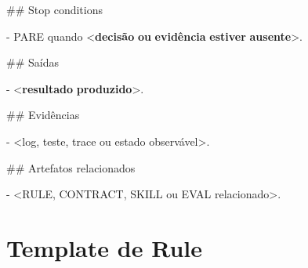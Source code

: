 \documentclass[
  10pt,
  a4paper,
  oneside]{book}
\newenvironment{Shaded}{}{}
\newcommand{\DataTypeTok}[1]{\textcolor[rgb]{0.56,0.13,0.00}{#1}}
\newcommand{\ErrorTok}[1]{\textcolor[rgb]{1.00,0.00,0.00}{\textbf{#1}}}
\newcommand{\FunctionTok}[1]{\textcolor[rgb]{0.02,0.16,0.49}{#1}}
\newcommand{\KeywordTok}[1]{\textcolor[rgb]{0.00,0.44,0.13}{\textbf{#1}}}
\newcommand{\NormalTok}[1]{#1}
\newcommand{\SpecialStringTok}[1]{\textcolor[rgb]{0.73,0.40,0.53}{#1}}
\begin{document}
\begin{Shaded}
\begin{Highlighting}[]
\FunctionTok{\#\# Stop conditions}

\SpecialStringTok{{-} }\NormalTok{PARE quando }\DataTypeTok{\textless{}}\KeywordTok{decisão} \ErrorTok{ou} \ErrorTok{evidência} \ErrorTok{estiver} \ErrorTok{ausente}\DataTypeTok{\textgreater{}}\NormalTok{.}

\FunctionTok{\#\# Saídas}

\SpecialStringTok{{-} }\DataTypeTok{\textless{}}\KeywordTok{resultado} \ErrorTok{produzido}\DataTypeTok{\textgreater{}}\NormalTok{.}

\FunctionTok{\#\# Evidências}

\SpecialStringTok{{-} }\NormalTok{\textless{}log, teste, trace ou estado observável\textgreater{}.}

\FunctionTok{\#\# Artefatos relacionados}

\SpecialStringTok{{-} }\NormalTok{\textless{}RULE, CONTRACT, SKILL ou EVAL relacionado\textgreater{}.}
\end{Highlighting}
\end{Shaded}

\hypertarget{template-de-rule}{%
\section{Template de Rule}\label{template-de-rule}}
\end{document}
